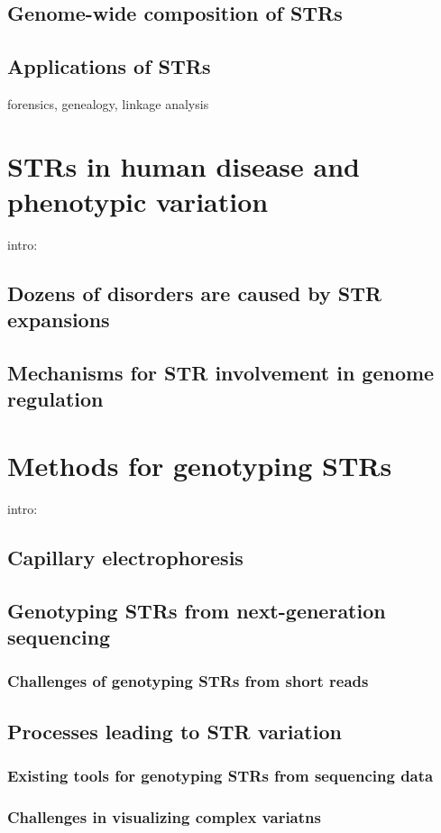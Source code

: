 \subsection{Genome-wide composition of STRs}
\subsection{Applications of STRs}
forensics, genealogy, linkage analysis

\section{STRs in human disease and phenotypic variation}
intro: 
\subsection{Dozens of disorders are caused by STR expansions}
\subsection{Mechanisms for STR involvement in genome regulation}

\section{Methods for genotyping STRs}
intro:
\subsection{Capillary electrophoresis}
\subsection{Genotyping STRs from next-generation sequencing}
\subsubsection{Challenges of genotyping STRs from short reads}
\subsection{Processes leading to STR variation}
\subsubsection{Existing tools for genotyping STRs from sequencing data}
\subsubsection{Challenges in visualizing complex variatns}
